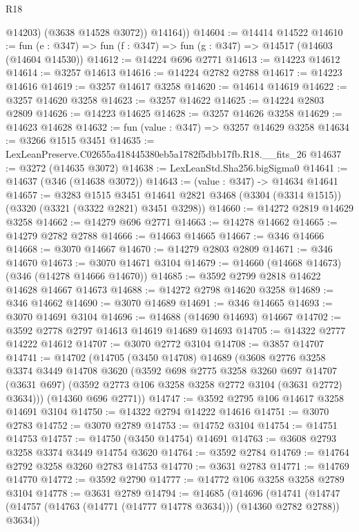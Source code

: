\begin{lexlean}{R18}
\begin{coremodule}
            @14203)
          (@3638 @14528 @3072))
        @14164))
@14604 := @14414 @14522
@14610 := fun (e : @347) => fun (f : @347) => fun (g : @347) => @14517 (@14603 (@14604 @14530))
@14612 := @14224 @696 @2771
@14613 := @14223 @14612
@14614 := @3257 @14613
@14616 := @14224 @2782 @2788
@14617 := @14223 @14616
@14619 := @3257 @14617 @3258
@14620 := @14614 @14619
@14622 := @3257 @14620 @3258
@14623 := @3257 @14622
@14625 := @14224 @2803 @2809
@14626 := @14223 @14625
@14628 := @3257 @14626 @3258
@14629 := @14623 @14628
@14632 := fun (value : @347) => @3257 @14629 @3258
@14634 := @3266 @1515 @3451
@14635 := LexLeanPreserve.C02655a418445380eb5a1782f5dbb17fb.R18.__fits_26
@14637 := @3272 (@14635 @3072)
@14638 := LexLeanStd.Sha256.bigSigma0
@14641 := @14637 (@346 (@14638 @3072))
@14643 := (value : @347) -> @14634 @14641
@14657 := @3283
    @1515
    @3451
    @14641
    @2821
    @3468
    (@3304 (@3314 @1515))
    (@3320 (@3321 (@3322 @2821) @3451 @3298))
@14660 := @14272 @2819 @14629 @3258
@14662 := @14279 @696 @2771
@14663 := @14278 @14662
@14665 := @14279 @2782 @2788
@14666 := @14663 @14665
@14667 := @346 @14666
@14668 := @3070 @14667
@14670 := @14279 @2803 @2809
@14671 := @346 @14670
@14673 := @3070 @14671 @3104
@14679 := @14660 (@14668 @14673) (@346 (@14278 @14666 @14670))
@14685 := @3592 @2799 @2818 @14622 @14628 @14667 @14673
@14688 := @14272 @2798 @14620 @3258
@14689 := @346 @14662
@14690 := @3070 @14689
@14691 := @346 @14665
@14693 := @3070 @14691 @3104
@14696 := @14688 (@14690 @14693) @14667
@14702 := @3592 @2778 @2797 @14613 @14619 @14689 @14693
@14705 := @14322 @2777 @14222 @14612
@14707 := @3070 @2772 @3104
@14708 := @3857 @14707
@14741 := @14702
    (@14705
      (@3450 @14708)
      @14689
      (@3608
        @2776
        @3258
        @3374
        @3449
        @14708
        @3620
        (@3592
          @698
          @2775
          @3258
          @3260
          @697
          @14707
          (@3631 @697)
          (@3592 @2773 @106 @3258 @3258 @2772 @3104 (@3631 @2772) @3634)))
      (@14360 @696 @2771))
@14747 := @3592 @2795 @106 @14617 @3258 @14691 @3104
@14750 := @14322 @2794 @14222 @14616
@14751 := @3070 @2783
@14752 := @3070 @2789
@14753 := @14752 @3104
@14754 := @14751 @14753
@14757 := @14750 (@3450 @14754) @14691
@14763 := @3608 @2793 @3258 @3374 @3449 @14754 @3620
@14764 := @3592 @2784
@14769 := @14764 @2792 @3258 @3260 @2783 @14753
@14770 := @3631 @2783
@14771 := @14769 @14770
@14772 := @3592 @2790
@14777 := @14772 @106 @3258 @3258 @2789 @3104
@14778 := @3631 @2789
@14794 := @14685
    (@14696
      (@14741 (@14747 (@14757 (@14763 (@14771 (@14777 @14778 @3634))) (@14360 @2782 @2788)) @3634))

\end{coremodule}
\end{lexlean}
